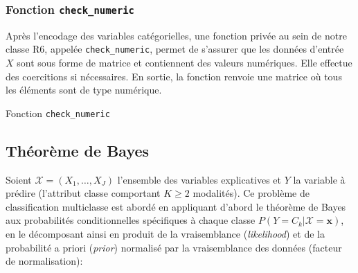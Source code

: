 \documentclass[]{article}
\begin{document}
\newpage
\subsubsection{Fonction \texttt{check\_numeric}} 
Après l'encodage des variables catégorielles, une fonction privée au sein de notre classe R6, appelée \texttt{check\_numeric}, permet de s'assurer que les données d'entrée \(X\) sont sous forme de matrice et contiennent des valeurs numériques. Elle effectue des coercitions si nécessaires. En sortie, la fonction renvoie une matrice où tous les éléments sont de type numérique.
\vspace{0.3\baselineskip}

\begin{algorithm}
    \caption{Fonction \texttt{check\_numeric}}
    

\end{algorithm}
\vspace{0.2\baselineskip}

\subsection{Théorème de Bayes}

Soient \(\mathcal{X} = (X_1, \ldots, X_J)\) l'ensemble des variables explicatives et \(Y\) la variable à prédire (l'attribut classe comportant \(K \geq 2\) modalités). Ce problème de classification multiclasse est abordé en appliquant d'abord le théorème de Bayes aux probabilités conditionnelles spécifiques à chaque classe \(P(Y = C_k | \mathcal{X} = \mathbf{x})\), en le décomposant ainsi en produit de la vraisemblance (\textit{likelihood}) et de la probabilité a priori (\textit{prior}) normalisé par la vraisemblance des données (facteur de normalisation): \vspace{0.4\baselineskip}
\end{document}
